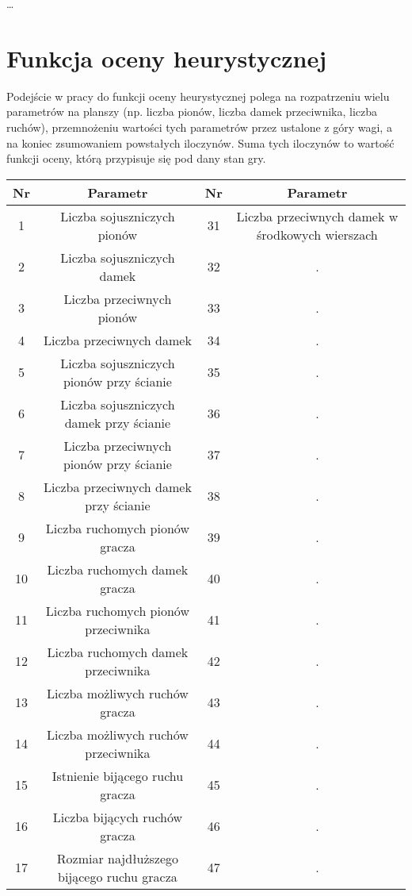 \ldots

\section{Funkcja oceny heurystycznej}

Podejście w pracy do funkcji oceny heurystycznej polega na rozpatrzeniu wielu parametrów na planszy (np. liczba pionów, liczba damek przeciwnika, liczba ruchów), przemnożeniu wartości tych parametrów przez ustalone z góry wagi, a na koniec zsumowaniem powstałych iloczynów. Suma tych iloczynów to wartość funkcji oceny, którą przypisuje się pod dany stan gry.

{\small
\begin{center}
\begin{tabular}{|c | c || c | c|} 
 \hline
 Nr & Parametr & Nr & Parametr \\ %
 \hline\hline
 1 & Liczba sojuszniczych pionów & 31 & Liczba przeciwnych damek w środkowych wierszach \\ 
 \hline
 2 & Liczba sojuszniczych damek & 32 & . \\
 \hline
 3 & Liczba przeciwnych pionów & 33 & . \\
 \hline
 4 & Liczba przeciwnych damek & 34 & . \\
 \hline
 5 & Liczba sojuszniczych pionów przy ścianie & 35 & . \\
 \hline
 6 & Liczba sojuszniczych damek przy ścianie & 36 & . \\ 
 \hline
 7 & Liczba przeciwnych pionów przy ścianie & 37 & . \\
 \hline
 8 & Liczba przeciwnych damek przy ścianie & 38 & . \\
 \hline
 9 & Liczba ruchomych pionów gracza & 39 & . \\
 \hline
 10 & Liczba ruchomych damek gracza & 40 & . \\
 \hline
 11 & Liczba ruchomych pionów przeciwnika & 41 & . \\ 
 \hline
 12 & Liczba ruchomych damek przeciwnika & 42 & . \\
 \hline
 13 & Liczba możliwych ruchów gracza & 43 & . \\
 \hline
 14 & Liczba możliwych ruchów przeciwnika & 44 & . \\
 \hline
 15 & Istnienie bijącego ruchu gracza & 45 & . \\
 \hline
 16 & Liczba bijących ruchów gracza & 46 & . \\ 
 \hline
 17 & Rozmiar najdłuższego bijącego ruchu gracza & 47 & . \\

\end{tabular}
\end{center}}
